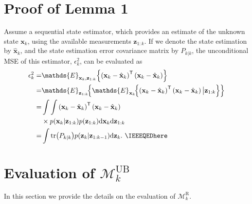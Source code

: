 \documentclass[10pt,twocolumn,twoside]{IEEEtran}
\newcommand{\tran}{^{\mathsf{T}}}
\newcommand{\expectx}{\mathds{E}_{\mathbf{x}_k}\!}
\newcommand{\expectz}{\mathds{E}_{\mathbf{z}_{1:k}}\!}
\newcommand{\corcol}[1]{\textcolor{CorCol}{#1}}
\begin{document}
\section{Proof of Lemma 1}
\label{sec:uncondMSEProof}
\begin{IEEEproof} Assume a sequential state estimator, which provides an estimate of the unknown state \({\mathbf{{x}}}_{k}\), using the available measurements \({\mathbf{{z}}}_{1:k}\). If we denote the state estimation by \(\hat{\mathbf{{x}}}_{k}\), and the state estimation error covariance matrix by \(P_{k|k}\), the unconditional MSE of this estimator, \(\epsilon_k ^2\), can be evaluated as
\corcol{
\begin{align}
\epsilon_k ^2 = & \mathds{E}_{\mathbf{x}_k,\mathbf{z}_{1:k}}{\left\lbrace \left(\mathbf{x}_{k}-\hat{\mathbf{{x}}}_{k}\right)\tran\left(\mathbf{x}_{k}-\hat{\mathbf{x}}_{k}\right) \right\rbrace }
\\= & \expectz {\left\lbrace \expectx {\left\lbrace \left(\mathbf{{x}}_{k} -  \hat{\mathbf{{x}}}_{k}\right)\tran\left(\mathbf{{x}}_{k} -  \hat{\mathbf{{x}}}_{k}\right) \big|\mathbf{{z}}_{1:k}\right\rbrace} \right\rbrace}\\
\nonumber
= & \int \int \left(\mathbf{{x}}_{k} -  \hat{\mathbf{{x}}}_{k}\right)\tran\left(\mathbf{{x}}_{k} -  \hat{\mathbf{{x}}}_{k}\right)  \\
& \times  p{\left(\mathbf{{x}}_{k}|\mathbf{{z}}_{1:k}\right)}p{\left(\mathbf{{z}}_{1:k}\right)}\mathrm{d}\mathbf{{x}}_{k}\mathrm{d}\mathbf{{z}}_{1:k} \\
= & \int \mathrm{tr}{\left(P_{k|k}\right)}p{\left(\mathbf{{z}}_{k}|\mathbf{{z}}_{1:k-1}\right)} \mathrm{d}\mathbf{{z}}_{k}. \ \IEEEQEDhere
\end{align}}
\end{IEEEproof} 

\section{Evaluation of \(\mathcal{M}^{\mathrm{UB}}_k\)}
\label{sec:MUB}
In this section we provide the details on the evaluation of \(\mathcal{M}^{\mathrm{R}}_k\).
\end{document}
